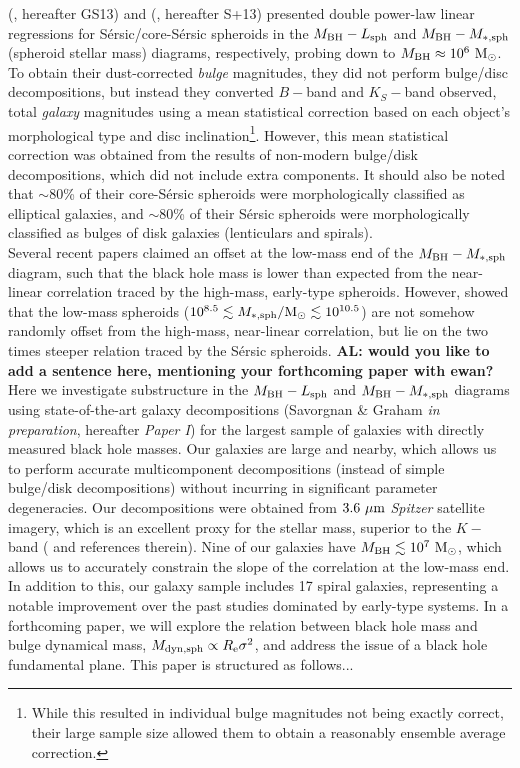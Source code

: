 \documentclass[preprint2]{emulateapj}
\begin{document}
\citeauthor{grahamscott2013} (\citeyear{grahamscott2013}, hereafter GS13) and \citeauthor{scott2013} (\citeyear{scott2013}, hereafter S+13) 
presented double power-law linear regressions 
for S\'ersic/core-S\'ersic spheroids in the $M_{\rm BH} - L_{\rm sph}$ and $M_{\rm BH} - M_{\rm *,sph}$ 
(spheroid stellar mass) diagrams, respectively, probing down to $M_{\rm BH} \approx 10^6\rm~M_\odot$. 
To obtain their dust-corrected \emph{bulge} magnitudes, they did not perform bulge/disc decompositions, 
but instead they converted $B-$band and $K_S-$band observed, total \emph{galaxy} magnitudes 
using a mean statistical correction based on each object's morphological type and disc 
inclination\footnote{While this resulted in individual bulge magnitudes not being exactly correct, 
their large sample size allowed them to obtain a reasonably ensemble average correction.}. 
However, this mean statistical correction was obtained from the results of non-modern bulge/disk decompositions, 
which did not include extra components. 
It should also be noted that $\sim$80\% of their core-S\'ersic spheroids were morphologically classified as elliptical galaxies, 
and $\sim$80\% of their S\'ersic spheroids were morphologically classified as bulges of disk galaxies (lenticulars and spirals). \\
Several recent papers \citep{jiang2011a,jiang2013,mathur2012,reines2013} claimed an offset at the low-mass end of the $M_{\rm BH} - M_{\rm *,sph}$ diagram,
such that the black hole mass is lower than expected from the near-linear correlation traced by the high-mass, early-type spheroids. 
However, \cite{grahamscott2015} showed that the low-mass spheroids ($10^{8.5} \lesssim M_{\rm *,sph}/{\rm M_\odot} \lesssim 10^{10.5}$) 
are not somehow randomly offset from the high-mass, near-linear correlation, 
but lie on the two times steeper relation traced by the S\'ersic spheroids. 
{\bf AL: would you like to add a sentence here, mentioning your forthcoming paper with ewan?} \\
Here we investigate substructure in the $M_{\rm BH} - L_{\rm sph}$ and $M_{\rm BH} - M_{\rm *,sph}$ diagrams 
using state-of-the-art galaxy decompositions (Savorgnan \& Graham \emph{in preparation}, hereafter \emph{Paper I}) 
for the largest sample of galaxies with directly measured black hole masses.
Our galaxies are large and nearby, which allows us to perform accurate multicomponent decompositions 
(instead of simple bulge/disk decompositions) without incurring in significant parameter degeneracies. 
Our decompositions were obtained from $3.6\rm~\mu m$ \emph{Spitzer} satellite imagery, 
which is an excellent proxy for the stellar mass, superior to the $K-$band (\citealt{sheth2010} and references therein).
Nine of our galaxies have $M_{\rm BH} \lesssim 10^7\rm~M_\odot$, 
which allows us to accurately constrain the slope of the correlation at the low-mass end.
In addition to this, our galaxy sample includes 17 spiral galaxies, 
representing a notable improvement over the past studies dominated by early-type systems. 
In a forthcoming paper, we will explore the relation between black hole mass and bulge dynamical mass, 
$M_{\rm dyn,sph} \propto R_{\rm e} \sigma^2$, and address the issue of a black hole fundamental plane.
This paper is structured as follows... 
\end{document}
